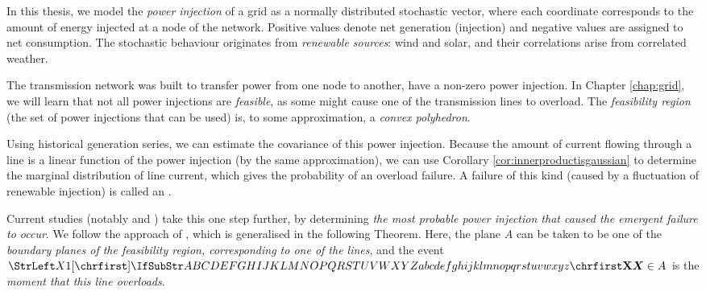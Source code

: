 \documentclass[main.tex]{subfiles}
\begin{document}
In this thesis, we model the \emph{power injection} of a grid as a normally distributed stochastic vector, where each coordinate corresponds to the amount of energy injected at a node of the network. Positive values denote net generation (injection) and negative values are assigned to net consumption. The stochastic behaviour originates from \emph{renewable sources}: wind and solar, and their correlations arise from correlated weather. 

The transmission network was built to transfer power from one node to another, \ie have a non-zero power injection.
In Chapter \ref{chap:grid}, we will learn that not all power injections are \emph{feasible}, as some might cause one of the transmission lines to overload. The \emph{feasibility region} (the set of power injections that can be used) is, to some approximation, a \emph{convex polyhedron}.

Using historical generation series, we can estimate the covariance of this power injection. Because the amount of current flowing through a line is a linear function of the power injection (by the same approximation), we can use Corollary \ref{cor:innerproductisgaussian} to determine the marginal distribution of line current, which gives the probability of an overload failure. A failure of this kind (\ie caused by a fluctuation of renewable injection) is called an .

Current studies (notably \cite{Nesti2018emergentfailures} and \cite{Chertkov2011}) take this one step further, by determining \emph{the most probable power injection that caused the emergent failure to occur}. We follow the approach of \cite{Nesti2018emergentfailures}, which is generalised in the following Theorem. Here, the plane $A$ can be taken to be one of the \emph{boundary planes of the feasibility region, corresponding to one of the lines}, and the event $\mat{X} \in A$ is the \emph{moment that this line overloads}.
\end{document}
